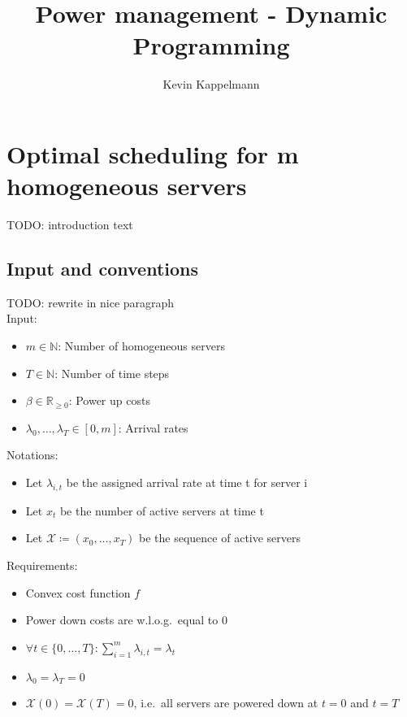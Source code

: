 \documentclass[hidelinks]{article}
\title{Power management - Dynamic Programming}
\author{Kevin Kappelmann\\
  \multicolumn{1}{p{.7\textwidth}}{\centering\emph{Chair for Theoretical Computer Science,\\
  Technical University of Munich}}}
\theoremstyle{plain}
\theoremstyle{definition}
\theoremstyle{rem}
\begin{document}

\begin{sloppypar}
\section{Optimal scheduling for m homogeneous servers}\label{sec:opt}
TODO: introduction text
\subsection{Input and conventions}
TODO: rewrite in nice paragraph\\
Input:
\begin{itemize}
	\item $m\in\mathbb{N}$: Number of homogeneous servers
	\item $T\in\mathbb{N}$: Number of time steps
	\item $\beta\in\mathbb{R}_{\ge 0}$: Power up costs
	\item $\lambda_0,\ldots,\lambda_{T}\in[0,m]$: Arrival rates
\end{itemize}
Notations:
\begin{itemize}
	\item Let $\lambda_{i,t}$ be the assigned arrival rate at time t for server i
	\item Let $x_t$ be the number of active servers at time t
	\item Let $\mathcal{X}\coloneqq(x_0,\ldots,x_T)$ be the sequence of active servers
\end{itemize}
Requirements:
\begin{itemize}
	\item Convex cost function $f$
	\item Power down costs are w.l.o.g.\ equal to 0
	\item $\forall t\in \{0,\ldots,T\}:\sum\limits_{i=1}^{m}{\lambda_{i,t}=\lambda_t}$
	\item $\lambda_0=\lambda_T=0$
	\item $\mathcal{X}(0)=\mathcal{X}(T)=0$, i.e.\ all servers are powered down at $t=0$ and $t=T$
\end{itemize}


\end{sloppypar}
\end{document}
